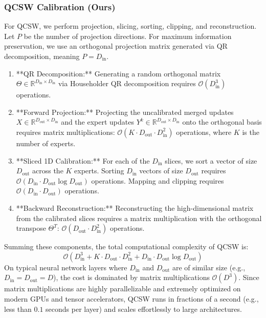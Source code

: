 \documentclass{article}
\theoremstyle{plain}
\theoremstyle{definition}
\theoremstyle{remark}
\begin{document}
\subsubsection{QCSW Calibration (Ours)}
For QCSW, we perform projection, slicing, sorting, clipping, and reconstruction. Let $P$ be the number of projection directions. For maximum information preservation, we use an orthogonal projection matrix generated via QR decomposition, meaning $P = D_{\text{in}}$.
\begin{enumerate}
    \item **QR Decomposition:** Generating a random orthogonal matrix $\Theta \in \mathbb{R}^{D_{\text{in}} \times D_{\text{in}}}$ via Householder QR decomposition requires $\mathcal{O}(D_{\text{in}}^3)$ operations.
    \item **Forward Projection:** Projecting the uncalibrated merged updates $X \in \mathbb{R}^{D_{\text{out}} \times D_{\text{in}}}$ and the expert updates $Y^k \in \mathbb{R}^{D_{\text{out}} \times D_{\text{in}}}$ onto the orthogonal basis requires matrix multiplications: $\mathcal{O}(K \cdot D_{\text{out}} \cdot D_{\text{in}}^2)$ operations, where $K$ is the number of experts.
    \item **Sliced 1D Calibration:** For each of the $D_{\text{in}}$ slices, we sort a vector of size $D_{\text{out}}$ across the $K$ experts. Sorting $D_{\text{in}}$ vectors of size $D_{\text{out}}$ requires $\mathcal{O}(D_{\text{in}} \cdot D_{\text{out}} \log D_{\text{out}})$ operations. Mapping and clipping requires $\mathcal{O}(D_{\text{in}} \cdot D_{\text{out}})$ operations.
    \item **Backward Reconstruction:** Reconstructing the high-dimensional matrix from the calibrated slices requires a matrix multiplication with the orthogonal transpose $\Theta^T$: $\mathcal{O}(D_{\text{out}} \cdot D_{\text{in}}^2)$ operations.
\end{enumerate}
Summing these components, the total computational complexity of QCSW is:
\begin{equation}
\mathcal{O}\left( D_{\text{in}}^3 + K \cdot D_{\text{out}} \cdot D_{\text{in}}^2 + D_{\text{in}} \cdot D_{\text{out}} \log D_{\text{out}} \right)
\end{equation}
On typical neural network layers where $D_{\text{in}}$ and $D_{\text{out}}$ are of similar size (e.g., $D_{\text{in}} = D_{\text{out}} = D$), the cost is dominated by matrix multiplications $\mathcal{O}(D^3)$. Since matrix multiplications are highly parallelizable and extremely optimized on modern GPUs and tensor accelerators, QCSW runs in fractions of a second (e.g., less than $0.1$ seconds per layer) and scales effortlessly to large architectures.
\end{document}
